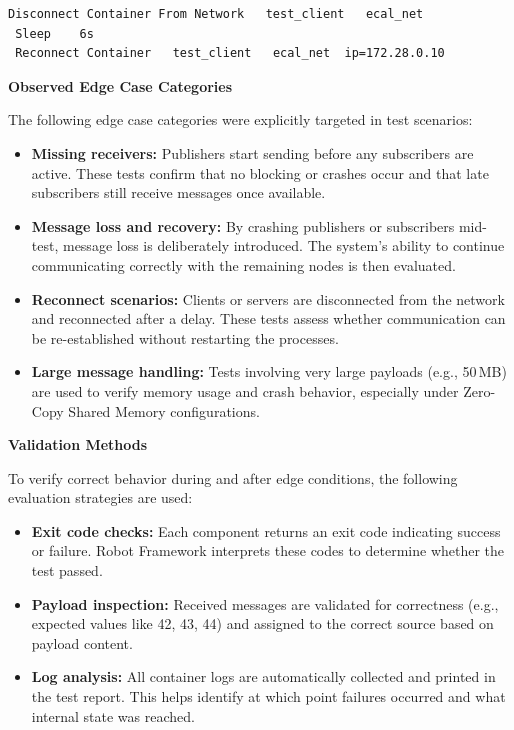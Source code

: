\vspace{0.5em}
\begin{lstlisting}[style=cppstyle, caption={Simulating a temporary network disconnect and reconnect}, label={lst:rf_disconnect_example}, captionpos=b]
 Disconnect Container From Network   test_client   ecal_net
 Sleep    6s
 Reconnect Container   test_client   ecal_net  ip=172.28.0.10
\end{lstlisting}

\vspace{1em}
\textbf{Observed Edge Case Categories}

\vspace{0.4em}
The following edge case categories were explicitly targeted in test scenarios:

\begin{itemize}
	\item \textbf{Missing receivers:} Publishers start sending before any subscribers are active. These tests confirm that no blocking or crashes occur and that late subscribers still receive messages once available.
	
	\item \textbf{Message loss and recovery:} By crashing publishers or subscribers mid-test, message loss is deliberately introduced. The system’s ability to continue communicating correctly with the remaining nodes is then evaluated.
	
	\item \textbf{Reconnect scenarios:} Clients or servers are disconnected from the network and reconnected after a delay. These tests assess whether communication can be re-established without restarting the processes.
	
	\item \textbf{Large message handling:} Tests involving very large payloads (e.g., 50\,MB) are used to verify memory usage and crash behavior, especially under Zero-Copy Shared Memory configurations.
\end{itemize}

\vspace{0.5em}
\textbf{Validation Methods}

\vspace{0.4em}
To verify correct behavior during and after edge conditions, the following evaluation strategies are used:

\begin{itemize}
	\item \textbf{Exit code checks:} Each component returns an exit code indicating success or failure. Robot Framework interprets these codes to determine whether the test passed.
	
	\item \textbf{Payload inspection:} Received messages are validated for correctness (e.g., expected values like 42, 43, 44) and assigned to the correct source based on payload content.
	
	\item \textbf{Log analysis:} All container logs are automatically collected and printed in the test report. This helps identify at which point failures occurred and what internal state was reached.
\end{itemize}

